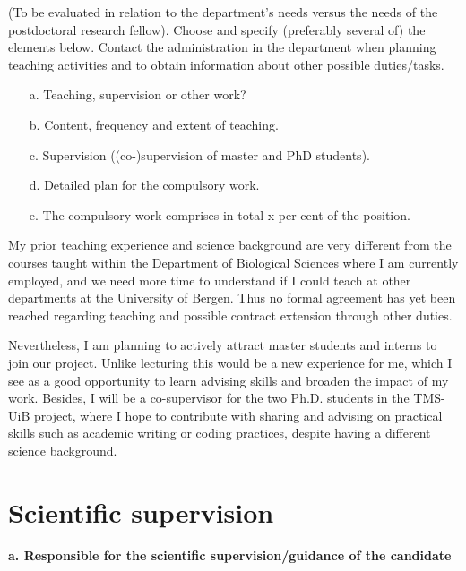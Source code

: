 \documentclass{article}
\newcommand{\guideline}[1]{{\color{color2}\itshape{#1}}}
\begin{document}
    \guideline{
        (To be evaluated in relation to the department’s needs versus the needs
        of the postdoctoral research fellow). Choose and specify (preferably
        several of) the elements below. Contact the administration in the
        department when planning teaching activities and to obtain information
        about other possible duties/tasks.

        \begin{itemize}
          \item[a.] Teaching, supervision or other work?
          \item[b.] Content, frequency and extent of teaching.
          \item[c.] Supervision ((co-)supervision of master and PhD students).
          \item[d.] Detailed plan for the compulsory work.
          \item[e.] The compulsory work comprises in total x per cent of the position.
        \end{itemize}}

    My prior teaching experience and science background are very different from
    the courses taught within the Department of Biological Sciences where I am
    currently employed, and we need more time to understand if I could teach
    at other departments at the University of Bergen. Thus no formal agreement
    has yet been reached regarding teaching and possible contract extension
    through other duties.

    Nevertheless,
    I am planning to actively attract master students and interns to join our
    project. Unlike lecturing this would be a new experience for me, which I
    see as a good opportunity to learn advising skills and broaden the impact
    of my work. Besides, I will be a co-supervisor for the two Ph.D. students
    in the TMS-UiB project, where I hope to contribute with sharing and
    advising on practical skills such as academic writing or coding practices,
    despite having a different science background.


\section{Scientific supervision}

    \textbf{a. Responsible for the scientific supervision/guidance of the
            candidate}
\end{document}
